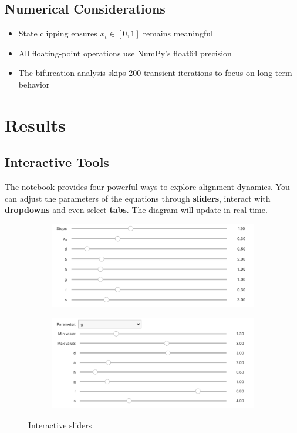 \documentclass[a4paper, 10pt]{article}
\begin{document}
\subsection{Numerical Considerations}
\begin{itemize}
	\item State clipping ensures $x_t \in [0,1]$ remains meaningful
	\item All floating-point operations use NumPy's float64 precision
	\item The bifurcation analysis skips 200 transient iterations to focus on long-term behavior
\end{itemize}

\clearpage
\section{Results}
\label{sec:results}
\subsection{Interactive Tools}
The notebook provides four powerful ways to explore alignment dynamics. 
You can adjust the parameters of the equations through \textbf{sliders}, interact with \textbf{dropdowns} and even select \textbf{tabs}. The diagram will update in real-time.

\begin{figure}[h!]
    \centering
    \begin{subfigure}{0.45\textwidth}
        \centering
        \includegraphics[width=\linewidth]{../images/results/sliders1.pdf}
        \label{fig:sliders1}
    \end{subfigure}
    \hfill
    \begin{subfigure}{0.45\textwidth}
        \centering
        \includegraphics[width=\linewidth]{../images/results/sliders2.pdf}
        \label{fig:sliders2}
    \end{subfigure}
    \caption{Interactive sliders}
    \label{fig:side_by_side}
\end{figure}
\end{document}
